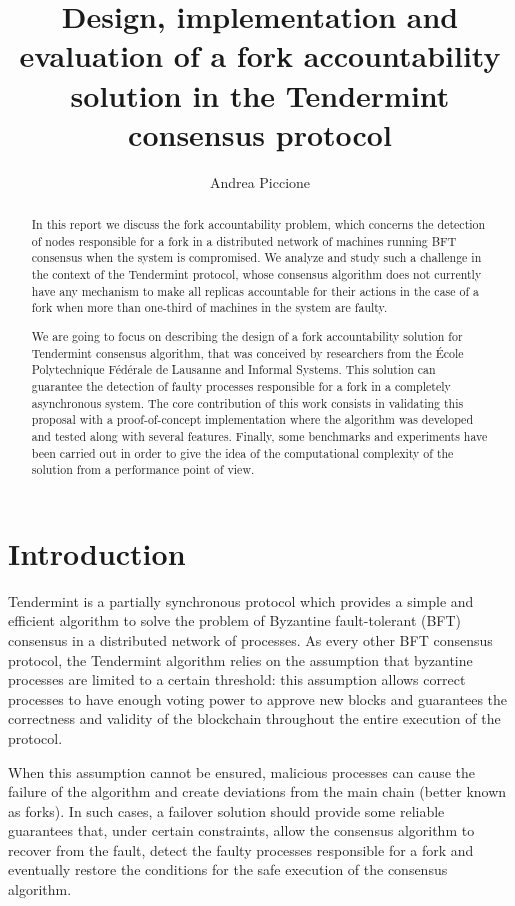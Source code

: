 \documentclass[a4paper,11pt,oneside]{report}
\title{Design, implementation and evaluation of a fork accountability\\solution in the Tendermint consensus protocol}
\author{Andrea Piccione}
\begin{document}
\maketitle

\begin{abstract}

In this report we discuss the fork accountability problem, which concerns the detection of nodes responsible for a fork in a distributed network of machines running BFT consensus when the system is compromised. We analyze and study such a challenge in the context of the Tendermint protocol, whose consensus algorithm does not currently have any mechanism to make all replicas accountable for their actions in the case of a fork when more than one-third of machines in the system are faulty.

We are going to focus on describing the design of a fork accountability solution for Tendermint consensus algorithm, that was conceived by researchers from the École Polytechnique Fédérale de Lausanne and Informal Systems. This solution can guarantee the detection of faulty processes responsible for a fork in a completely asynchronous system. The core contribution of this work consists in validating this proposal with a proof-of-concept implementation where the algorithm was developed and tested along with several features. Finally, some benchmarks and experiments have been carried out in order to give the idea of the computational complexity of the solution from a performance point of view.

\end{abstract}

\maketoc

\chapter{Introduction}

Tendermint is a partially synchronous protocol which provides a simple and efficient algorithm to solve the problem of Byzantine fault-tolerant (BFT) consensus in a distributed network of processes. As every other BFT consensus protocol, the Tendermint algorithm relies on the assumption that byzantine processes are limited to a certain threshold: this assumption allows correct processes to have enough voting power to approve new blocks and guarantees the correctness and validity of the blockchain throughout the entire execution of the protocol. 

When this assumption cannot be ensured, malicious processes can cause the failure of the algorithm and create deviations from the main chain (better known as forks). In such cases, a failover solution should provide some reliable guarantees that, under certain constraints, allow the consensus algorithm to recover from the fault, detect the faulty processes responsible for a fork and eventually restore the conditions for the safe execution of the consensus algorithm.        
\end{document}
